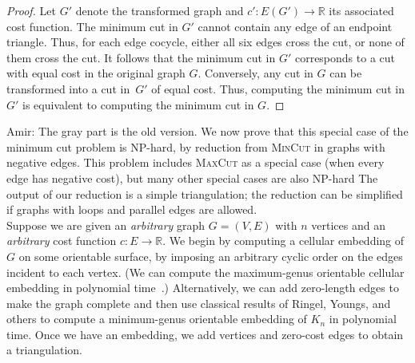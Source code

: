 \documentclass[letterpaper,review]{siamart190516}
\def\Real{\mathbb{R}}
\def\anote#1{\color{purple}Amir: #1 \color{black}}
\begin{document}
{\begin{proof}
Let $G'$ denote the transformed graph and $c'\colon E(G')\to \Real$ its associated cost function.  The minimum cut in $G'$ cannot contain any edge of an endpoint triangle.  Thus, for each edge cocycle, either all six edges cross the cut, or none of them cross the cut.  It follows that the minimum cut in $G'$ corresponds to a cut with equal cost in the original graph $G$.  Conversely, any cut in $G$ can be transformed into a cut in~$G'$ of equal cost.  Thus, computing the minimum cut in $G'$ is equivalent to computing the minimum cut in $G$.
\end{proof}
\color{black}

\anote{The gray part is the old version.}
\color{gray}
We now prove that this special case of the minimum cut problem is {NP}-hard, by  reduction from \textsc{MinCut} in graphs with negative edges.  This problem includes \textsc{MaxCut} as a special case (when every edge has negative cost), but many other special cases are also {NP}-hard%
The output of our reduction is a simple triangulation; the reduction can be simplified if graphs with loops and parallel edges are allowed.
\\
Suppose we are given an \emph{arbitrary} graph $G = (V,E)$ with $n$ vertices and an \emph{arbitrary} cost function $c\colon E\to \Real$.  We begin by computing a cellular embedding of $G$ on some orientable surface, by imposing an arbitrary cyclic order on the edges incident to each vertex.
(We can compute the maximum-genus orientable cellular embedding  in polynomial time~\cite{fgm-fmggi-88}.)  Alternatively, we can add zero-length edges to make the graph complete and then use classical results of Ringel, Youngs, and others \cite{ry-shmcp-68,r-mct-74} to compute a minimum-genus orientable embedding of $K_n$ in polynomial time.  Once we have an embedding, we add vertices and zero-cost edges to obtain a triangulation.

}
\end{document}
